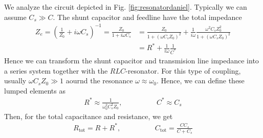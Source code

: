 We analyze the circuit depicted in Fig. \ref{fig:resonatordaniel}. Typically we can assume $C_s\gg C$. The shunt capacitor and feedline have the total impedance
\begin{align}
Z_e = \left(\frac{1}{Z_0}+i\omega C_s\right)^{-1} = \frac{Z_0}{1+i\omega C_s} &= \frac{Z_0}{1+(\omega C_s Z_0)^2} + \frac{1}{i\omega}\frac{\omega^2 C_s Z_0^2}{1+(\omega C_s Z_0)^2} \\%
&= R^* + \frac{1}{i\omega}\frac{1}{C^*}
\end{align}
Hence we can transform the shunt capacitor and transmision line impedance into a series system together with the $RLC$-resonator. For this type of coupling, usually $\omega C_s Z_0\gg1$ aournd the resonance $\omega\approx\omega_0$. Hence, we can define these lumped elements as
\begin{align}
R^* \approx \frac{1}{\omega_0^2 C_s^2 Z_0}, \hspace{2cm}C^*\approx C_s
\end{align}
Then, for the total capacitance and resistance, we get 
\begin{align}
R_\mathrm{tot} = R+R^*, \hspace{2cm} C_\mathrm{tot}=\frac{C C_s}{C + C_s}
\end{align}

